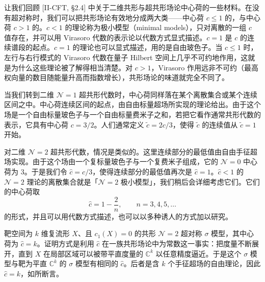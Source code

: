 让我们回顾 [II-CFT, §2.4] 中关于二维共形与超共形场论中心荷的一些材料。在没有超对称时，我们可以把共形场论有效地分成两大类——中心荷 $c\le1$ 的，与中心荷 $c>1$ 的。$c<1$ 的理论称为极小模型（minimal models），只对离散的一组 $c$ 值存在，并可以用 Virasoro 代数的表示论以代数方式显式描述。$c=1$ 是 $c$ 的连续谱段的起点。$c=1$ 的理论也可以显式描述，用的是自由玻色子。当 $c\le1$ 时，左行与右行模式的 Virasoro 代数在量子 Hilbert 空间上几乎不可约地作用，这就是为什么这些理论被了解得相当清楚。对 $c>1$，Virasoro 作用远非不可约（最高权向量的数目随能量升高而指数增长），共形场论的味道就完全不同了。

当我们转到二维 $\mathcal{N}=1$ 超共形代数时，中心荷同样落在某个离散集合或某个连续区间之中。中心荷连续区间的起点，由自由标量超场所实现的理论给出。由于这个场是一个自由标量玻色子与一个自由标量费米子之和，若把它看作通常共形代数的表示，它具有中心荷 $c=3/2$。人们通常定义 $\tilde c=2c/3$，使得 $\tilde c$ 的连续值从 $\tilde c=1$ 开始。


对二维 $\mathcal{N}=2$ 超共形代数，情况是类似的。这里连续部分的最低值由自由手征超场实现。由于这个场由一个复标量玻色子与一个复费米子组成，它的 $\mathcal{N}=0$ 中心荷为 $3$。于是我们令 $\hat c=c/3$，使得连续部分的最低值再次是 $\hat c=1$。$\hat c<1$ 的 $\mathcal{N}=2$ 理论的离散集合就是「$\mathcal{N}=2$ 极小模型」，我们稍后会详细考虑它们。它们的中心荷取
\[
\hat c=1-\frac{2}{n},\qquad n=3,4,5,\dots
\]
的形式，并且可以用代数方式描述，也可以以多种诱人的方式加以研究。

靶空间为 $k$ 维复流形 $X$、且 $c_1(X)=0$ 的共形 $\mathcal{N}=2$ 超对称 $\sigma$ 模型，其中心荷为 $\hat c=k$。证明方式是利用 $\hat c$ 在一族共形场论中为常数这一事实：把度量不断展开，直到 $X$ 在局部区域可以被带平直度量的 $\mathbb{C}^k$ 以任意精度逼近。于是这个 $\sigma$ 模型与靶为平直 $\mathbb{C}^k$ 的 $\sigma$ 模型有相同的 $\hat c$。后者是含 $k$ 个手征超场的自由理论，因此 $\hat c=k$，如所断言。



